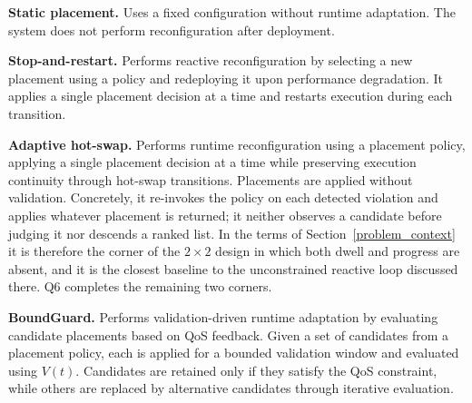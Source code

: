 \documentclass[conference]{IEEEtran}
\begin{document}
\noindent\textbf{Static placement.}
Uses a fixed configuration without runtime adaptation. 
The system does not perform reconfiguration after deployment.

\noindent\textbf{Stop-and-restart.}
Performs reactive reconfiguration by selecting a new placement using a policy and redeploying it upon performance degradation. 
It applies a single placement decision at a time and restarts execution during each transition.

\noindent\textbf{Adaptive hot-swap.}
Performs runtime reconfiguration using a placement policy, applying a single placement decision at a time while preserving execution continuity through hot-swap transitions. 
Placements are applied without validation.
\textcolor{navyblue}{Concretely, it re-invokes the policy on each detected violation and applies whatever placement is returned; it neither observes a candidate before judging it nor descends a ranked list. In the terms of Section~\ref{problem_context} it is therefore the corner of the $2\times2$ design in which both dwell and progress are absent, and it is the closest baseline to the unconstrained reactive loop discussed there. Q6 completes the remaining two corners.}

\noindent\textbf{BoundGuard.}
Performs validation-driven runtime adaptation by evaluating candidate placements based on QoS feedback. 
Given a set of candidates from a placement policy, each is applied for a bounded validation window and evaluated using $V(t)$. 
Candidates are retained only if they satisfy the QoS constraint, while others are replaced by alternative candidates through iterative evaluation.
\end{document}
